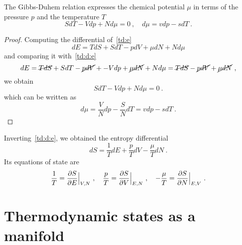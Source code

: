     The Gibbs-Duhem relation expresses the chemical potential $\mu$ in terms of the pressure $p$ and the temperature $T$ 
    \begin{equation}\label{td:gd}
        S dT - Vdp + N d\mu = 0 ~, \quad d \mu = v dp - s dT ~.
    \end{equation}
    \begin{proof}
        Computing the differential of~\eqref{td:e} 
        \begin{equation*}
            dE = T dS + S dT -p dV + \mu dN + N d\mu 
        \end{equation*}
        and comparing it with~\eqref{td:d:e}
        \begin{equation*}
            dE = \cancel{T dS} + S dT - \cancel{p dV} + - V dp + \cancel{\mu dN} + N d\mu = \cancel{T dS} - \cancel{p dV} + \cancel{\mu dN} ~,
        \end{equation*}
        we obtain 
        \begin{equation*}
            S dT - V dp + N d\mu = 0 ~.
        \end{equation*}
        which can be written as 
        \begin{equation*}
            d \mu = \frac{V}{N} dp - \frac{S}{N} dT = v dp - s dT ~.
        \end{equation*}
    \end{proof}

    Inverting~\eqref{td:d:e}, we obtained the entropy differential
    \begin{equation}\label{td:d:s}
        dS = \frac{1}{T} dE + \frac{p}{T} dV - \frac{\mu}{T} dN ~.
    \end{equation}
    Its equations of state are 
    \begin{equation}\label{td:es:s}
        \frac{1}{T} = \frac{\partial S}{\partial E} \Big \vert_{V, N} ~, \quad \frac{p}{T} = \frac{\partial S}{\partial V} \Big \vert_{E, N} ~, \quad - \frac{\mu}{T} = \frac{\partial S}{\partial N} \Big \vert_{E, V} ~.
    \end{equation}

\section{Thermodynamic states as a manifold}

